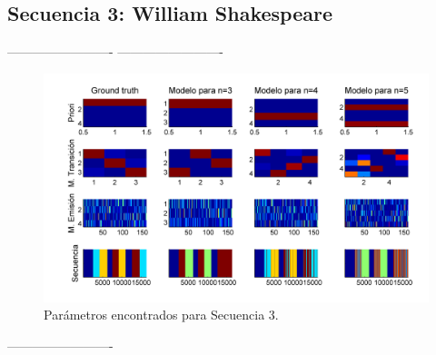 \newpage
\subsection{Secuencia 3: William Shakespeare}

-------------------------
-------------------------

\begin{figure}[H]
  \centerline
  {\includegraphics[width=1.3\linewidth]{gfx/chap6/lear31}} \quad
  \caption{Parámetros encontrados para Secuencia 3.}
  \label{fig:prb1_par}
\end{figure}

-------------------------

